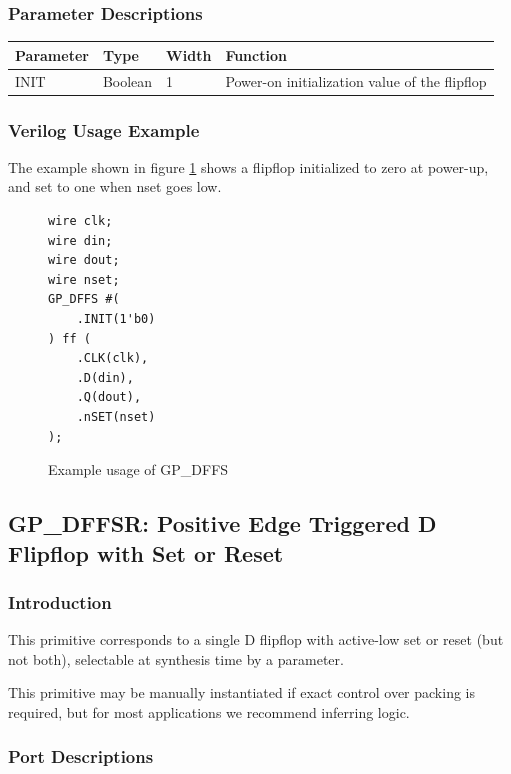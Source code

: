 \documentclass{article}
\begin{document}
\subsubsection{Parameter Descriptions}

\begin{tabularx}{5in}{|l|l|l|X|}
\hline
{\bfseries Parameter} & {\bfseries Type} & {\bfseries Width} & {\bfseries Function} \\
\hline
INIT & Boolean & 1 & Power-on initialization value of the flipflop \\
\hline
\end{tabularx}

\subsubsection{Verilog Usage Example}

The example shown in figure \ref{gp-dffs-example} shows a flipflop initialized to zero at power-up, and set to one
when nset goes low.

\begin{figure}[h]
\begin{lstlisting}
wire clk;
wire din;
wire dout;
wire nset;
GP_DFFS #(
	.INIT(1'b0)
) ff (
	.CLK(clk),
	.D(din),
	.Q(dout),
	.nSET(nset)
);
\end{lstlisting}
\caption{Example usage of GP\_DFFS}
\label{gp-dffs-example}
\end{figure}


\pagebreak
\subsection{GP\_DFFSR: Positive Edge Triggered D Flipflop with Set or Reset}

\subsubsection{Introduction}
This primitive corresponds to a single D flipflop with active-low set or reset (but not both), selectable at synthesis 
time by a parameter.

This primitive may be manually instantiated if exact control over packing is required, but for most applications we 
recommend inferring logic.

\subsubsection{Port Descriptions}
\end{document}
